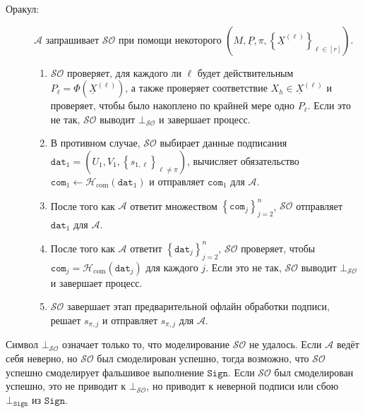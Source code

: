 \documentclass{mrl}
\theoremstyle{definition}
\numberwithin{theorem}{subsection}
\newcommand{\adversary}{\mathcal{A}}
\begin{document}
\begin{description}
\item [Оракул:] $\adversary$ запрашивает $\mathcal{SO}$ при помощи некоторого $\left(M, \underline{P}, \pi, \left\{\underline{X}^{(\ell)}\right\}_{\ell \in [r]}\right)$.

\begin{enumerate}
\item $\mathcal{SO}$ проверяет, для каждого ли $\ell$ будет действительным $P_\ell = \Phi(\underline{X}^{(\ell)})$, а также проверяет соответствие $X_h \in \underline{X}^{(\ell)}$ и проверяет, чтобы было накоплено по крайней мере одно $P_\ell$. Если это не так, $\mathcal{SO}$ выводит $\bot_{\mathcal{SO}}$ и завершает процесс.

\item \label{dat1} В противном случае, $\mathcal{SO}$ выбирает данные подписания $\texttt{dat}_1 = (U_1, V_1, \left\{s_{1, \ell}\right\}_{\ell \neq \pi})$, вычисляет обязательство $\texttt{com}_1 \leftarrow \mathcal{H}_{\text{com}}(\texttt{dat}_1)$ и отправляет $\texttt{com}_1$ для $\adversary$.

\item После того как $\adversary$ ответит множеством $\left\{\texttt{com}_j\right\}_{j = 2}^{n}$, $\mathcal{SO}$ отправляет $\texttt{dat}_{1}$ для $\adversary$.

\item После того как $\adversary$ ответит $\left\{\texttt{dat}_{j}\right\}_{j=2}^{n}$, $\mathcal{SO}$ проверяет, чтобы $\texttt{com}_j = \mathcal{H}_{\text{com}}(\texttt{dat}_j)$ для каждого $j$. Если это не так, $\mathcal{SO}$ выводит $\bot_{\mathcal{SO}}$ и завершает процесс.

\item $\mathcal{SO}$ завершает этап предварительной офлайн обработки подписи, решает $s_{\pi, j}$ и отправляет $s_{\pi,j}$ для $\adversary$.

\end{enumerate}

\end{description}

Символ $\bot_{\mathcal{SO}}$ означает только то, что моделирование $\mathcal{SO}$ не удалось. Если $\adversary$ ведёт себя неверно, но $\mathcal{SO}$ был смоделирован успешно, тогда возможно, что $\mathcal{SO}$ успешно смоделирует фальшивое выполнение $\texttt{Sign}$. Если $\mathcal{SO}$ был смоделирован успешно, это не приводит к $\bot_{\mathcal{SO}}$, но приводит к неверной подписи или сбою $\bot_{\texttt{Sign}}$ из $\texttt{Sign}$.
\end{document}
